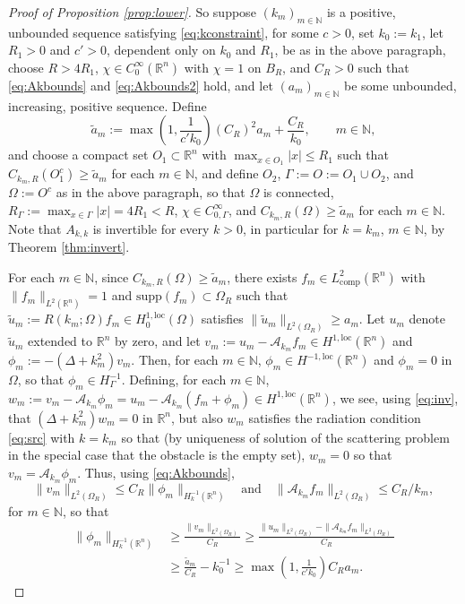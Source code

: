 \documentclass{birkjour}
\theoremstyle{definition}
\theoremstyle{remark}
\numberwithin{equation}{section}
\newcommand{\R}{\mathbb{R}}
\newcommand{\N}{\mathbb{N}}
\newcommand{\Hol}{H^{1,\mathrm{loc}}}
\newcommand{\cA}{\mathcal{A}}
\newcommand{\supp}{\mathrm{supp}}
\begin{document}
\begin{proof}[Proof of Proposition \ref{prop:lower}]
So suppose $(k_m)_{m\in \N}$  is a positive, unbounded sequence satisfying \eqref{eq:kconstraint}, for some $c>0$,  set $k_0 := k_1$, let $R_1>0$ and $c'>0$, dependent only on $k_0$ and $R_1$, be as in the above paragraph,  choose $R>4R_1$, $\chi\in C_0^\infty(\R^n)$ with $\chi=1$ on $B_R$, and $C_R>0$ such that \eqref{eq:Akbounds} and \eqref{eq:Akbounds2} hold, and let $(a_m)_{m\in \N}$ be some unbounded, increasing, positive sequence. Define 
$$
\tilde a_m := \max\left(1,\frac{1}{c'k_0}\right)(C_R)^2a_m + \frac{C_R}{k_0}, \qquad m\in \N,
$$ 
and choose a compact set $O_1\subset \R^n$ with $\max_{x\in O_1}|x|\leq R_1$ such that $C_{k_m,R}(O_1^c)\geq \tilde a_m$ for each $m\in \N$, and define $O_2$, $\Gamma:=O:=O_1\cup O_2$, and $\Omega:= O^c$  as  in the above paragraph, so that $\Omega$ is connected, $R_\Gamma:= \max_{x\in \Gamma}|x|=4R_1<R$, $\chi\in C_{0,\Gamma}^\infty$, and $C_{k_m,R}(\Omega)\geq \tilde a_m$ for each $m\in \N$. Note that $A_{k,k}$ is invertible for every $k>0$, in particular for $k=k_m$, $m\in \N$, by Theorem \ref{thm:invert}.

For each $m\in \N$, since $C_{k_m,R}(\Omega)\geq \tilde a_m$, there exists $f_m\in L^2_{\mathrm{comp}}(\R^n)$ with $\|f_m\|_{L^2(\R^n)}=1$ and $\supp(f_m)\subset \Omega_R$ such that $\tilde u_m:=  R(k_m;\Omega)f_m\in \Hol_0(\Omega)$ satisfies $\|\tilde u_m\|_{L^2(\Omega_R)}\geq a_m$. Let $u_m$ denote $\tilde u_m$ extended to $\R^n$ by zero, and let $v_m:= u_m-\cA_{k_m} f_m\in \Hol(\R^n)$ and $\phi_m := -(\Delta+k_m^2)v_m$. Then, for each $m\in \N$, $\phi_m\in H^{-1,\mathrm{loc}}(\R^n)$ and $\phi_m=0$ in $\Omega$, so that $\phi_m\in H_\Gamma^{-1}$. Defining, for each $m\in \N$, $w_m:= v_m-\cA_{k_m}\phi_m = u_m -\cA_{k_m}(f_m+\phi_m)\in \Hol(\R^n)$, we see, using \eqref{eq:inv}, that $(\Delta+k_m^2)w_m=0$ in $\R^n$, but also $w_m$ satisfies the radiation condition \eqref{eq:src} with $k=k_m$ so that (by uniqueness of solution of the scattering problem in the special case that the obstacle is the empty set), $w_m=0$ so that $v_m=\cA_{k_m}\phi_m$. Thus,
using \eqref{eq:Akbounds},
$$
\|v_m\|_{L^2(\Omega_R)} \leq C_R \|\phi_m\|_{H^{-1}_k(\R^n)} \quad \mbox{and} \quad \|\cA_{k_m} f_m\|_{L^2(\Omega_R)} \leq C_R/k_m,
$$
for $m\in \N$, so that
\begin{align*}
 \|\phi_m\|_{H^{-1}_k(\R^n)} &\geq \frac{\|v_m\|_{L^2(\Omega_R)}}{C_R}\geq \frac{\|u_m\|_{L^2(\Omega_R)}-\|\cA_{k_m}f_m\|_{L^2(\Omega_R)}}{C_R}\\
 & \geq \frac{\tilde a_m}{C_R}-k_0^{-1} \geq \max\left(1,\frac{1}{c'k_0}\right)C_R a_m.
\end{align*}


\end{proof}
\end{document}

